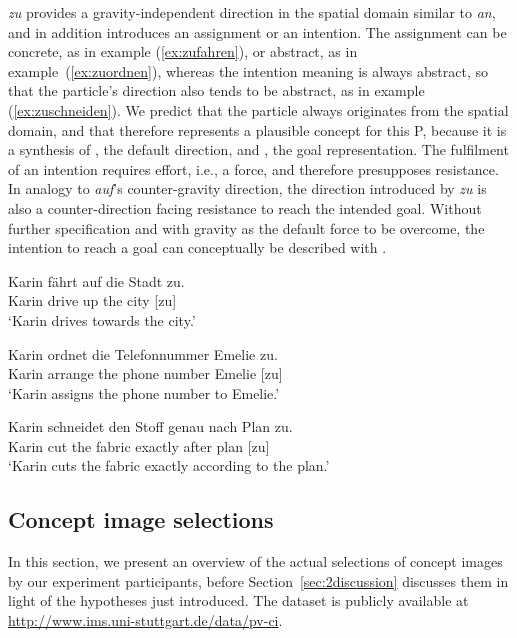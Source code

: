 \documentclass[output=paper]{langsci/langscibook}
\begin{document}
\textit{zu} provides a gravity-independent direction in the spatial
domain similar to \textit{an}, and in addition introduces an
assignment or an intention. The assignment can be concrete, as in
example (\ref{ex:zufahren}), or abstract, as in
example~(\ref{ex:zuordnen}), whereas the intention meaning is always
abstract, so that the particle's direction also tends to be abstract,
as in example (\ref{ex:zuschneiden}). We predict that the particle
always originates from the spatial domain, and that
 therefore represents a plausible concept for
this P, because it is a synthesis of , the default
direction, and , the goal representation. The
fulfilment of an intention requires effort, i.e., a force, and
therefore presupposes resistance. In analogy to \textit{auf}'s
counter-gravity direction, the direction introduced by \textit{zu} is
also a counter-direction facing resistance to reach the intended
goal. Without further specification and with gravity as the default
force to be overcome, the intention to reach a goal can conceptually
be described with .

\ea\label{ex:zufahren}
\gll Karin fährt auf die Stadt zu.\\
Karin drive up the city [zu]\\
\glt `Karin drives towards the city.'
\z

\ea\label{ex:zuordnen}
\gll Karin ordnet die Telefonnummer Emelie zu.\\
Karin arrange the {phone number} Emelie [zu]\\
\glt `Karin assigns the phone number to Emelie.'
\z

\ea\label{ex:zuschneiden}
\gll Karin schneidet den Stoff genau nach Plan zu.\\
Karin cut the fabric exactly after plan [zu]\\
\glt `Karin cuts the fabric exactly according to the plan.'
\z


\vspace{+3mm}
\subsection{Concept image selections}

In this section, we present an overview of the actual selections of
concept images by our experiment participants, before
Section~\ref{sec:2discussion} discusses them in light of the hypotheses
just introduced. The dataset is publicly available at
\url{http://www.ims.uni-stuttgart.de/data/pv-ci}.
\end{document}
